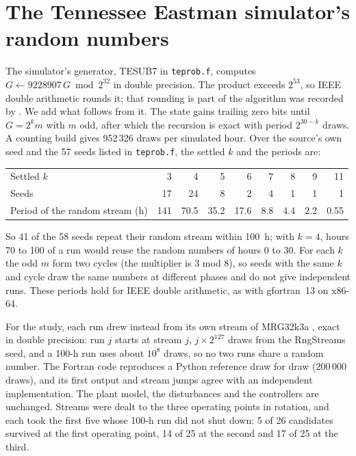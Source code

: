 \documentclass[10pt,a4paper]{article}
\begin{document}
\section{The Tennessee Eastman simulator's random numbers}\label{sec:rng}

The simulator's generator, TESUB7 in \texttt{teprob.f}, computes
$G \leftarrow 9228907\,G \bmod 2^{32}$ in double precision. The product exceeds $2^{53}$, so IEEE
double arithmetic rounds it; that rounding is part of the algorithm was recorded by
\citet{kitchin2026s}. We add what follows from it. The state gains trailing zero bits until
$G = 2^k m$ with $m$ odd, after which the recursion is exact with period $2^{30-k}$ draws. A
counting build gives 952\,326 draws per simulated hour. Over the source's own seed and the 57
seeds listed in \texttt{teprob.f}, the settled $k$ and the periods are:

\begin{center}\footnotesize
\begin{tabular}{@{}lrrrrrrrr@{}}
\toprule
Settled $k$ & 3 & 4 & 5 & 6 & 7 & 8 & 9 & 11 \\
Seeds & 17 & 24 & 8 & 2 & 4 & 1 & 1 & 1 \\
Period of the random stream (h) & 141 & 70.5 & 35.2 & 17.6 & 8.8 & 4.4 & 2.2 & 0.55 \\
\bottomrule
\end{tabular}
\end{center}

So 41 of the 58 seeds repeat their random stream within 100~h; with $k = 4$, hours 70 to 100 of a
run would reuse the random numbers of hours 0 to 30. For each $k$ the odd $m$ form two cycles (the
multiplier is 3 mod 8), so seeds with the same $k$ and cycle draw the same numbers at different
phases and do not give independent runs. These periods hold for IEEE double arithmetic, as with
gfortran~13 on x86-64.

For the study, each run drew instead from its own stream of MRG32k3a \citep{lecuyer1999s}, exact
in double precision: run $j$ starts at stream $j$, $j \times 2^{127}$ draws from the RngStreams
seed, and a 100-h run uses about $10^{8}$ draws, so no two runs share a random number. The Fortran
code reproduces a Python reference draw for draw (200\,000 draws), and its first output and stream
jumps agree with an independent implementation. The plant model, the disturbances and the
controllers are unchanged. Streams were dealt to the three operating points in rotation, and each
took the first five whose 100-h run did not shut down: 5 of 26 candidates survived at the first
operating point, 14 of 25 at the second and 17 of 25 at the third.
\end{document}
